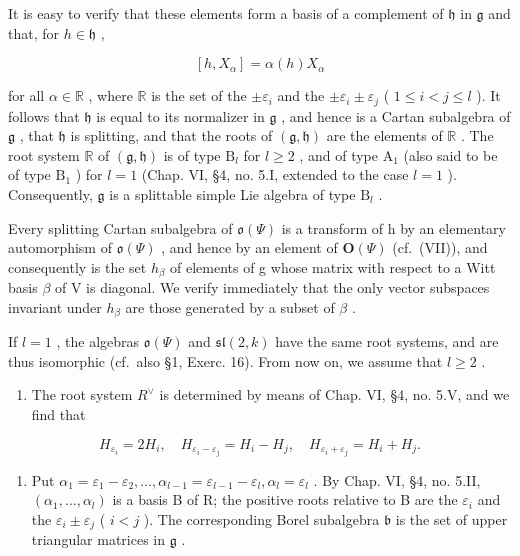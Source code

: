 It is easy to verify that these elements form a basis of a complement of \(\mathfrak{h}\) in \(\mathfrak{g}\) and that, for \(h\in \mathfrak{h}\) ,

\[
[ h, X _ {\alpha} ] = \alpha (h) X _ {\alpha}\tag{4}
\]

for all \(\alpha \in \mathbb{R}\) , where \(\mathbb{R}\) is the set of the \(\pm \varepsilon_i\) and the \(\pm \varepsilon_i \pm \varepsilon_j\) ( \(1 \leq i < j \leq l\) ). It follows that \(\mathfrak{h}\) is equal to its normalizer in \(\mathfrak{g}\) , and hence is a Cartan subalgebra of \(\mathfrak{g}\) , that \(\mathfrak{h}\) is splitting, and that the roots of \((\mathfrak{g}, \mathfrak{h})\) are the elements of \(\mathbb{R}\) . The root system \(\mathbb{R}\) of \((\mathfrak{g}, \mathfrak{h})\) is of type \(\mathrm{B}_l\) for \(l \geq 2\) , and of type \(\mathrm{A}_1\) (also said to be of type \(\mathrm{B}_1\) ) for \(l = 1\) (Chap. VI, §4, no. 5.I, extended to the case \(l = 1\) ). Consequently, \(\mathfrak{g}\) is a splittable simple Lie algebra of type \(\mathrm{B}_l\) .

Every splitting Cartan subalgebra of \(\mathfrak{o}(\varPsi)\) is a transform of h by an elementary automorphism of \(\mathfrak{o}(\varPsi)\) , and hence by an element of \(\mathbf{O}(\varPsi)\) (cf.~(VII)), and consequently is the set \(h_{\beta}\) of elements of g whose matrix with respect to a Witt basis \(\beta\) of V is diagonal. We verify immediately that the only vector subspaces invariant under \(h_{\beta}\) are those generated by a subset of \(\beta\) .

If \(l = 1\) , the algebras \(\mathfrak{o}(\varPsi)\) and \(\mathfrak{sl}(2, k)\) have the same root systems, and are thus isomorphic (cf.~also §1, Exerc. 16). From now on, we assume that \(l \geq 2\) .

\begin{enumerate}
\def\labelenumi{(\Roman{enumi})}
\setcounter{enumi}{1}
\tightlist
\item
  The root system \(R^{\vee}\) is determined by means of Chap. VI, §4, no. 5.V, and we find that
\end{enumerate}

\[
H _ {\varepsilon_ {i}} = 2 H _ {i}, \quad H _ {\varepsilon_ {i} - \varepsilon_ {j}} = H _ {i} - H _ {j}, \quad H _ {\varepsilon_ {i} + \varepsilon_ {j}} = H _ {i} + H _ {j}.
\]

\begin{enumerate}
\def\labelenumi{(\Roman{enumi})}
\setcounter{enumi}{2}
\tightlist
\item
  Put \(\alpha_{1} = \varepsilon_{1} - \varepsilon_{2},\ldots ,\alpha_{l - 1} = \varepsilon_{l - 1} - \varepsilon_{l},\alpha_{l} = \varepsilon_{l}\) . By Chap. VI, §4, no. 5.II, \((\alpha_{1},\dots ,\alpha_{l})\) is a basis B of R; the positive roots relative to B are the \(\varepsilon_{i}\) and the \(\varepsilon_{i}\pm \varepsilon_{j}\) ( \(i < j\) ). The corresponding Borel subalgebra \(\mathfrak{b}\) is the set of upper triangular matrices in \(\mathfrak{g}\) .
\end{enumerate}

